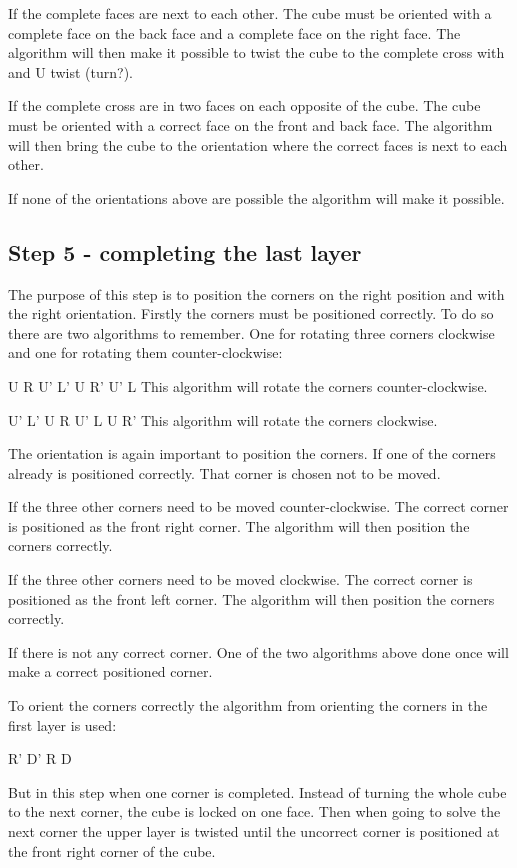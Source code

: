 If the complete faces are next to each other. The cube must be oriented with a complete face on the back face and a complete face on the right face. The algorithm will then make it possible to twist the cube to the complete cross with and U twist (turn?).

If the complete cross are in two faces on each opposite of the cube. The cube must be oriented with a correct face on the front and back face. The algorithm will then bring the cube to the orientation where the correct faces is next to each other.

If none of the orientations above are possible the algorithm will make it possible.

\subsection{Step 5 - completing the last layer}
The purpose of this step is to position the corners on the right position and with the right orientation. Firstly the corners must be positioned correctly. To do so there are two algorithms to remember. One for rotating three corners clockwise and one for rotating them counter-clockwise:

U R U' L' U R' U' L
This algorithm will rotate the corners counter-clockwise.

U' L' U R U' L U R'
This algorithm will rotate the corners clockwise.

The orientation is again important to position the corners. If one of the corners already is positioned correctly. That corner is chosen not to be moved. 

If the three other corners need to be moved counter-clockwise. The correct corner is positioned as the front right corner. The algorithm will then position the corners correctly.

If the three other corners need to be moved clockwise. The correct corner is positioned as the front left corner. The algorithm will then position the corners correctly.

If there is not any correct corner. One of the two algorithms above done once will make a correct positioned corner.

To orient the corners correctly the algorithm from orienting the corners in the first layer is used:

R' D' R D

But in this step when one corner is completed. Instead of turning the whole cube to the next corner, the cube is locked on one face. Then when going to solve the next corner the upper layer is twisted until the uncorrect corner is positioned at the front right corner of the cube.
